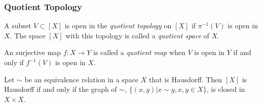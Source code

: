 \subsubsection{Quotient Topology}\label{quotienttopology}
A subset $V \subset [X]$ is open in the \emph{quotient topology} on $[X]$ if $\pi^{-1}(V)$ is open in $X$. The space $[X]$ with this topology is called a \emph{quotient space} of $X$.

\label{quotientmap}
An surjective map $f : X \rightarrow Y$ is called a \emph{quotient map} when $V$ is open in $Y$ if and only if $f^{-1}(V)$ is open in $X$.

\begin{theorem}
Let $\sim$ be an equivalence relation in a space $X$ that is Hausdorff. Then $[X]$ is Hausdorff if and only if the graph of $\sim$,
$\{ (x,y) | x \sim y, x, y \in X\}$, is closed in $X \times X$.
\end{theorem}